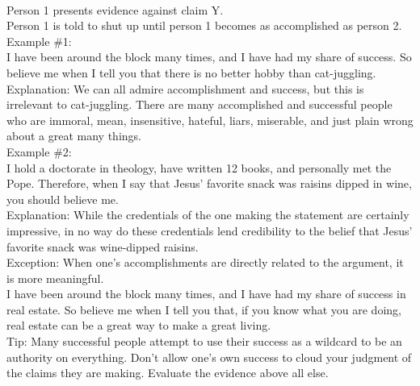 \documentclass[a4paper,12pt,single,pdftex]{scrartcl}
\begin{document}
    
       
    \\

    
      Person 1 presents evidence against claim Y.
    \\

    
      Person 1 is told to shut up until person 1 becomes as accomplished as person 2.
    \\

    
      Example \#1:
    \\

    
      I have been around the block many times, and I have had my share of success.  So believe me when I tell you that there is no better hobby than cat-juggling.
    \\

    
      Explanation: We can all admire accomplishment and success, but this is irrelevant to cat-juggling.  There are many accomplished and successful people who are immoral, mean, insensitive, hateful, liars,  miserable, and just plain wrong about a great many things.
    \\

    
      Example \#2:
    \\

    
      I hold a doctorate in theology, have written 12 books, and personally met the Pope.  Therefore, when I say that Jesus’ favorite snack was raisins dipped in wine, you should believe me.
    \\

    
      Explanation: While the credentials of the one making the statement are certainly impressive, in no way do these credentials lend credibility to the belief that Jesus’ favorite snack was wine-dipped raisins.
    \\

    
      Exception: When one’s accomplishments are directly related to the argument, it is more meaningful.
    \\

    
      I have been around the block many times, and I have had my share of success in real estate.  So believe me when I tell you that, if you know what you are doing, real estate can be a great way to make a great living.
    \\

    
      Tip: Many successful people attempt to use their success as a wildcard to be an authority on everything.  Don’t allow one’s own success to cloud your judgment of the claims they are making.  Evaluate the evidence above all else.
    \\
\end{document}
